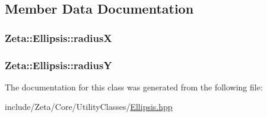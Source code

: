 \subsection{Member Data Documentation}
\hypertarget{classZeta_1_1Ellipsis_a9c875dc466b5880b11d808ad5e3bfb3c}{
\subsubsection[{radius\+X}]{ Zeta\+::\+Ellipsis\+::radius\+X\hspace{0.3cm}{\ttfamily [protected]}}}\label{classZeta_1_1Ellipsis_a9c875dc466b5880b11d808ad5e3bfb3c}
\hypertarget{classZeta_1_1Ellipsis_aa6b5d0ee74c527d2be837dfbbbcfc0bb}{
\subsubsection[{radius\+Y}]{ Zeta\+::\+Ellipsis\+::radius\+Y\hspace{0.3cm}{\ttfamily [protected]}}}\label{classZeta_1_1Ellipsis_aa6b5d0ee74c527d2be837dfbbbcfc0bb}


The documentation for this class was generated from the following file\+:\begin{DoxyCompactItemize}
\item 
include/\+Zeta/\+Core/\+Utility\+Classes/\hyperlink{Ellipsis_8hpp}{Ellipsis.\+hpp}\end{DoxyCompactItemize}
